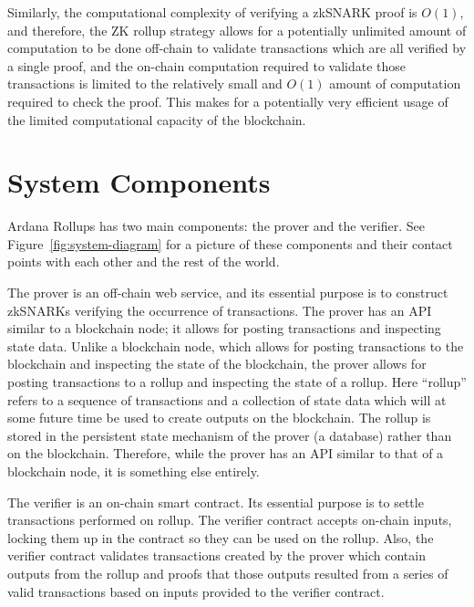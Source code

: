 \documentclass[12pt]{article}
\begin{document}
Similarly, the computational complexity of verifying a zkSNARK proof is $O(1)$, and therefore, the ZK rollup strategy allows for a potentially unlimited amount of computation to be done off-chain to validate transactions which are all verified by a single proof, and the on-chain computation required to validate those transactions is limited to the relatively small and $O(1)$ amount of computation required to check the proof. This makes for a potentially very efficient usage of the limited computational capacity of the blockchain.


\section{System Components}

Ardana Rollups has two main components: the prover and the verifier. See Figure~\ref{fig:system-diagram} for a picture of these components and their contact points with each other and the rest of the world.

The prover is an off-chain web service, and its essential purpose is to construct zkSNARKs verifying the occurrence of transactions. The prover has an API similar to a blockchain node; it allows for posting transactions and inspecting state data. Unlike a blockchain node, which allows for posting transactions to the blockchain and inspecting the state of the blockchain, the prover allows for posting transactions to a rollup and inspecting the state of a rollup. Here ``rollup'' refers to a sequence of transactions and a collection of state data which will at some future time be used to create outputs on the blockchain. The rollup is stored in the persistent state mechanism of the prover (a database) rather than on the blockchain. Therefore, while the prover has an API similar to that of a blockchain node, it is something else entirely.

The verifier is an on-chain smart contract. Its essential purpose is to settle transactions performed on rollup. The verifier contract accepts on-chain inputs, locking them up in the contract so they can be used on the rollup. Also, the verifier contract validates transactions created by the prover which contain outputs from the rollup and proofs that those outputs resulted from a series of valid transactions based on inputs provided to the verifier contract.
\end{document}
